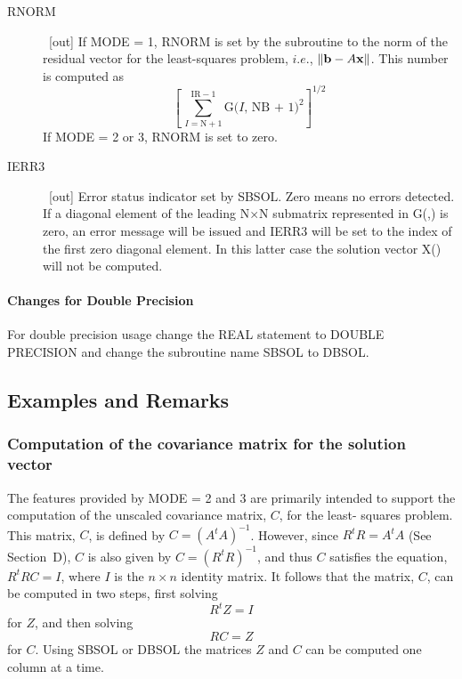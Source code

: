 \documentclass[twoside]{MATH77}
\begin{document}
\begin{description}
\item[RNORM]  \ [out] If MODE = 1, RNORM is set by the subroutine to the
norm of the residual vector for the least-squares problem, $i.e.$, $\Vert
{\bf b}-A{\bf x}\Vert $. This number is computed as%
\begin{equation*}
\left[\, \sum_{I=\text{N}+1}^{\text{IR}-1}\text{G(}I\text{, NB + 1})^2\right]
^{1/2}
\end{equation*}
If MODE = 2 or 3, RNORM is set to zero.

\item[IERR3]  \ [out] Error status indicator set by SBSOL. Zero means no
errors detected. If a diagonal element of the leading N$\times $N submatrix
represented in G(,) is zero, an error message will be issued and IERR3 will
be set to the index of the first zero diagonal element. In this latter case
the solution vector X() will not be computed.
\end{description}

\paragraph{Changes for Double Precision}

For double precision usage change the REAL statement to DOUBLE PRECISION and
change the subroutine name SBSOL to DBSOL.

\subsection{Examples and Remarks}

\subsubsection{Computation of the covariance matrix for the solution vector}

The features provided by MODE = 2 and 3 are primarily intended to support
the computation of the unscaled covariance matrix, $C$, for the least-%
squares problem. This matrix, $C$, is defined by $C = (A^tA)^{-1}$. However,
since $R^tR = A^tA$ (See Section~D), $C$ is also given by $C = (R^tR)^{-1}$,
and thus $C$ satisfies the equation, $R^tRC = I$, where $I$ is the $n\times n
$ identity matrix. It follows that the matrix, $C$, can be computed in two
steps, first solving
\begin{equation*}
R^tZ = I
\end{equation*}
for $Z$, and then solving
\begin{equation*}
RC = Z
\end{equation*}
for $C$. Using SBSOL or DBSOL the matrices $Z$ and $C$ can be computed one
column at a time.
\end{document}
